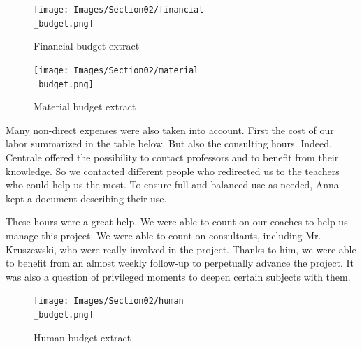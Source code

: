 \begin{figure}[ht]
    \centering
    \texttt{[image: Images/Section02/financial\\\_budget.png]}
    \caption{Financial budget extract}
    \label{fig:financialBudgetextract}
\end{figure}
\FloatBarrier

\begin{figure}[ht]
    \centering
    \texttt{[image: Images/Section02/material\\\_budget.png]}
    \caption{Material budget extract}
    \label{fig:materialBudgetextract}
\end{figure}
\FloatBarrier
Many non-direct expenses were also taken into account. First the cost of our labor summarized in the table below. But also the consulting hours. Indeed, Centrale offered the possibility to contact professors and to benefit from their knowledge. So we contacted different people who redirected us to the teachers who could help us the most. To ensure full and balanced use as needed, Anna kept a document describing their use. 

\bigbreak
These hours were a great help. We were able to count on our coaches to help us manage this project. We were able to count on consultants, including Mr. Kruszewski, who were really involved in the project. Thanks to him, we were able to benefit from an almost weekly follow-up to perpetually advance the project. It was also a question of privileged moments to deepen certain subjects with them.

\begin{figure}[ht]
    \centering
    \texttt{[image: Images/Section02/human\\\_budget.png]}
    \caption{Human budget extract}
    \label{fig:humanBudget}
\end{figure}